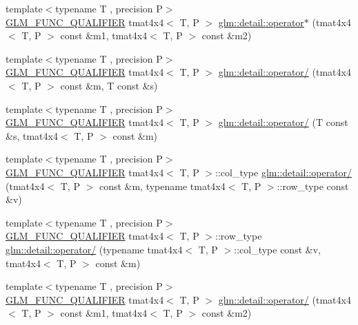 \begin{DoxyCompactItemize}
\item 
{\footnotesize template$<$typename T , precision P$>$ }\\\hyperlink{setup_8hpp_a33fdea6f91c5f834105f7415e2a64407}{G\+L\+M\+\_\+\+F\+U\+N\+C\+\_\+\+Q\+U\+A\+L\+I\+F\+I\+ER} tmat4x4$<$ T, P $>$ \hyperlink{namespaceglm_1_1detail_a018e8aca75e2ca4f2dbdd6aa70a8f4c4}{glm\+::detail\+::operator$\ast$} (tmat4x4$<$ T, P $>$ const \&m1, tmat4x4$<$ T, P $>$ const \&m2)
\item 
{\footnotesize template$<$typename T , precision P$>$ }\\\hyperlink{setup_8hpp_a33fdea6f91c5f834105f7415e2a64407}{G\+L\+M\+\_\+\+F\+U\+N\+C\+\_\+\+Q\+U\+A\+L\+I\+F\+I\+ER} tmat4x4$<$ T, P $>$ \hyperlink{namespaceglm_1_1detail_a5586a0820b354dafceeee9484e693cb5}{glm\+::detail\+::operator/} (tmat4x4$<$ T, P $>$ const \&m, T const \&s)
\item 
{\footnotesize template$<$typename T , precision P$>$ }\\\hyperlink{setup_8hpp_a33fdea6f91c5f834105f7415e2a64407}{G\+L\+M\+\_\+\+F\+U\+N\+C\+\_\+\+Q\+U\+A\+L\+I\+F\+I\+ER} tmat4x4$<$ T, P $>$ \hyperlink{namespaceglm_1_1detail_af3e7d786a2cfcbdbaa2383e2d8ea288b}{glm\+::detail\+::operator/} (T const \&s, tmat4x4$<$ T, P $>$ const \&m)
\item 
{\footnotesize template$<$typename T , precision P$>$ }\\\hyperlink{setup_8hpp_a33fdea6f91c5f834105f7415e2a64407}{G\+L\+M\+\_\+\+F\+U\+N\+C\+\_\+\+Q\+U\+A\+L\+I\+F\+I\+ER} tmat4x4$<$ T, P $>$\+::col\+\_\+type \hyperlink{namespaceglm_1_1detail_a4d23db95b1b441cb6f7a1b5dbac1b156}{glm\+::detail\+::operator/} (tmat4x4$<$ T, P $>$ const \&m, typename tmat4x4$<$ T, P $>$\+::row\+\_\+type const \&v)
\item 
{\footnotesize template$<$typename T , precision P$>$ }\\\hyperlink{setup_8hpp_a33fdea6f91c5f834105f7415e2a64407}{G\+L\+M\+\_\+\+F\+U\+N\+C\+\_\+\+Q\+U\+A\+L\+I\+F\+I\+ER} tmat4x4$<$ T, P $>$\+::row\+\_\+type \hyperlink{namespaceglm_1_1detail_ae1cb89d82b6b9798c31fe96d149a0bb8}{glm\+::detail\+::operator/} (typename tmat4x4$<$ T, P $>$\+::col\+\_\+type const \&v, tmat4x4$<$ T, P $>$ const \&m)
\item 
{\footnotesize template$<$typename T , precision P$>$ }\\\hyperlink{setup_8hpp_a33fdea6f91c5f834105f7415e2a64407}{G\+L\+M\+\_\+\+F\+U\+N\+C\+\_\+\+Q\+U\+A\+L\+I\+F\+I\+ER} tmat4x4$<$ T, P $>$ \hyperlink{namespaceglm_1_1detail_a321137ebbd4b97e7d8df53ce1a30cb47}{glm\+::detail\+::operator/} (tmat4x4$<$ T, P $>$ const \&m1, tmat4x4$<$ T, P $>$ const \&m2)

\end{DoxyCompactItemize}
